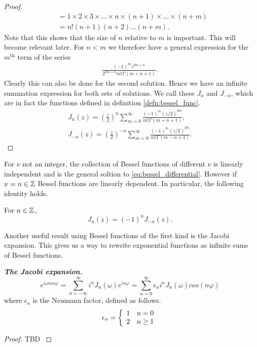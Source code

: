 \begin{proof}
\begin{align*}
      &= 1 \times 2 \times 3 \times ... \times n \times (n+1) \times ... \times (n+m) \\
      &= n! (n+1)(n+2)...(n+m).
  \end{align*}
  Note that this shows that the size of $n$ relative to $m$ is important. This will become relevant later. For $n<m$ we therefore have a general expression for the $m^{\text{th}}$ term of the series
  \begin{align*}
     \frac{(-1)^mz^{2m+n}}{2^{2m+n}m!\Gamma(m+n+1)}.
  \end{align*}
  Clearly this can also be done for the second solution. Hence we have an infinite summation expression for both sets of solutions. We call these $J_n$ and $J_{-n}$, which are in fact the functions defined in definition \ref{defn:bessel_func}.
  \begin{align*}
    J_n(z) = \left(\frac{z}{2}\right)^n \sum^\infty_{m=0} \frac{(-1)^m(z/2)^{2m}}{m!\Gamma(m+n+1)}, \\
    J_{-n}(z) = \left(\frac{z}{2}\right)^{-n} \sum^\infty_{m=0} \frac{(-1)^m(z/2)^{2m}}{m!\Gamma(m-n+1)}.
  \end{align*}
  \end{proof}

For $\nu$ not an integer, the collection of Bessel functions of different $\nu$ is linearly independent and is the general soltion to \ref{eq:bessel_differential}. However if $\nu = n \in \mathbb{Z}$ Bessel functions are linearly dependent. In particular, the following identity holds.

\begin{propn} \label{propn:bessel_int_order_identity} For $n \in \mathbb{Z}$,
  \begin{equation}
    J_n(z) = (-1)^n J_{-n}(z).
  \end{equation}

\end{propn}\par

Another useful result using Bessel functions of the first kind is the Jacobi expansion. This gives us a way to rewrite exponential functions as infinite sums of Bessel functions.

\begin{propn}\label{propn:jacobi_expansion}
\textbf{\emph{The Jacobi expansion.}}
    \[
    e ^{i \omega cos \varphi}
    = \sum^\infty_{n=-\infty} i^n J_n (\omega) e^{in\varphi}
    = \sum^\infty_{n=0} \epsilon_n i^n J_n(\omega) cos(n \varphi)
    \]
where $\epsilon_n$ is the Neumann factor, defined as follows.
    \begin{align*}
        \epsilon_n =\left\{
            \begin{array}{c l}
                 1 & n = 0 \\
                 2 & n \geq 1
            \end{array}\right.
    \end{align*}
\end{propn}
\begin{proof} TBD \parencite[$\S$2.5]{martin06scattering}
\end{proof}


